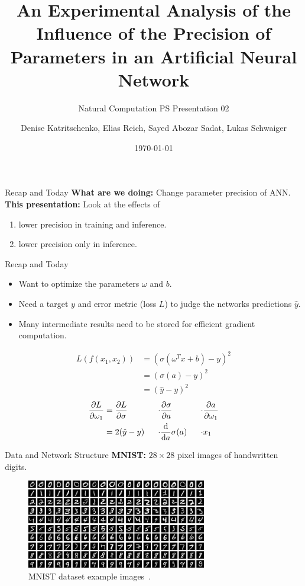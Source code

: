 \documentclass[aspectratio=169]{beamer} %
\title{An Experimental Analysis of the Influence of the Precision of Parameters in an Artificial Neural Network}
\subtitle{Natural Computation PS Presentation 02}
\author[D. K., E. R., S. A. S., L. S.]{Denise Katritschenko, Elias Reich, Sayed Abozar Sadat, Lukas Schwaiger}
\institute[\plusshort]{\pluslong\\ Department of Artificial Intelligence and Human Interfaces (AIHI)}
\date[\today]{\today}
\begin{document}
\frame{\titlepage}

\begin{frame}{Recap and Today}
  \textbf{What are we doing:} Change parameter precision of ANN.\\
  \vspace{0.5cm}
  \textbf{This presentation:} Look at the effects of
  \begin{enumerate}
    \item lower precision in training and inference.
    \item lower precision only in inference.
  \end{enumerate}
\end{frame}

\begin{frame}{Recap and Today}
  \begin{itemize}
    \item Want to optimize the parameters $\omega$ and $b$.
    \item Need a target $y$ and error metric (loss $L$) to judge the networks predictions
          $\hat y$.
    \item Many intermediate results need to be stored for efficient gradient computation.
  \end{itemize}

  \begin{align*}
    L(f(x_1, x_2)) & = (\sigma(\omega^T x + b) - y) ^2 \\
                   & = (\sigma(a) - y) ^ 2             \\
                   & = (\hat y - y) ^ 2
  \end{align*}
  \begin{alignat*}{3}
    \pdv{L}{\omega_1} & = \pdv{L}{\sigma} & \cdot & \pdv{\sigma}{a}      & \cdot & \pdv{a}{\omega_1} \\
                      & = 2(\hat y - y)~~ & \cdot & \odv{}{a}\sigma(a)~~ & \cdot & x_1
  \end{alignat*}
\end{frame}

\begin{frame}{Data and Network Structure}
  \textbf{MNIST:} $28 \times 28$ pixel images of handwritten digits.

  \begin{figure}
    \includegraphics[width=0.7\textwidth]{figures/mnist.png}
    \caption{MNIST dataset example images~\cite{mnistImage}.}
  \end{figure}
\end{frame}
\end{document}
